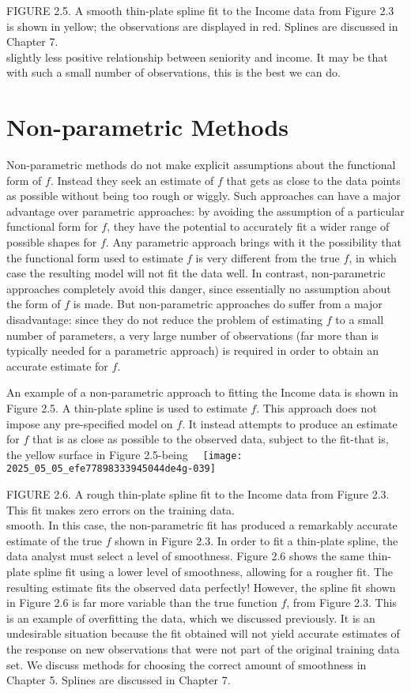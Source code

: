 \documentclass[10pt]{article}
\begin{document}
FIGURE 2.5. A smooth thin-plate spline fit to the Income data from Figure 2.3 is shown in yellow; the observations are displayed in red. Splines are discussed in Chapter 7.\\
slightly less positive relationship between seniority and income. It may be that with such a small number of observations, this is the best we can do.

\section*{Non-parametric Methods}
Non-parametric methods do not make explicit assumptions about the functional form of $f$. Instead they seek an estimate of $f$ that gets as close to the data points as possible without being too rough or wiggly. Such approaches can have a major advantage over parametric approaches: by avoiding the assumption of a particular functional form for $f$, they have the potential to accurately fit a wider range of possible shapes for $f$. Any parametric approach brings with it the possibility that the functional form used to estimate $f$ is very different from the true $f$, in which case the resulting model will not fit the data well. In contrast, non-parametric approaches completely avoid this danger, since essentially no assumption about the form of $f$ is made. But non-parametric approaches do suffer from a major disadvantage: since they do not reduce the problem of estimating $f$ to a small number of parameters, a very large number of observations (far more than is typically needed for a parametric approach) is required in order to obtain an accurate estimate for $f$.

An example of a non-parametric approach to fitting the Income data is shown in Figure 2.5. A thin-plate spline is used to estimate $f$. This approach does not impose any pre-specified model on $f$. It instead attempts to produce an estimate for $f$ that is as close as possible to the observed data, subject to the fit-that is, the yellow surface in Figure 2.5-being\
\
\texttt{[image: 2025\_05\_05\_efe77898333945044de4g-039]}

FIGURE 2.6. A rough thin-plate spline fit to the Income data from Figure 2.3. This fit makes zero errors on the training data.\\
smooth. In this case, the non-parametric fit has produced a remarkably accurate estimate of the true $f$ shown in Figure 2.3. In order to fit a thin-plate spline, the data analyst must select a level of smoothness. Figure 2.6 shows the same thin-plate spline fit using a lower level of smoothness, allowing for a rougher fit. The resulting estimate fits the observed data perfectly! However, the spline fit shown in Figure 2.6 is far more variable than the true function $f$, from Figure 2.3. This is an example of overfitting the data, which we discussed previously. It is an undesirable situation because the fit obtained will not yield accurate estimates of the response on new observations that were not part of the original training data set. We discuss methods for choosing the correct amount of smoothness in Chapter 5. Splines are discussed in Chapter 7.
\end{document}

